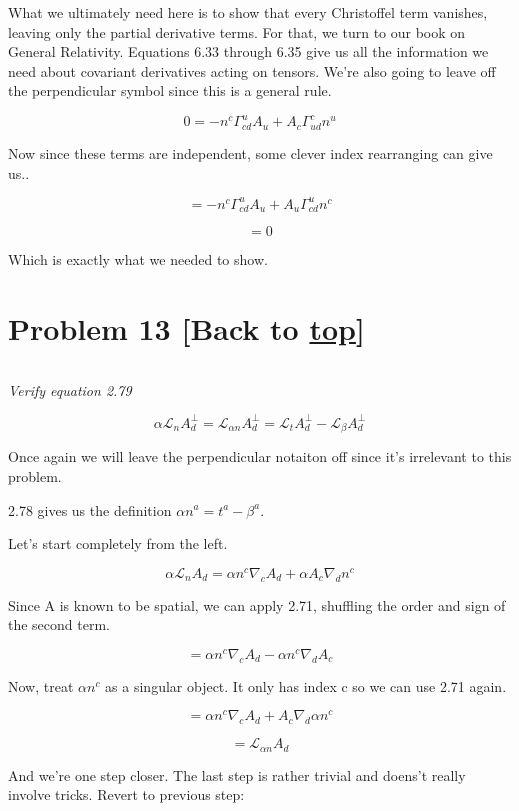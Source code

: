 \documentclass[landscape,letterpaper,10pt,english]{article}
\begin{document}
    What we ultimately need here is to show that every Christoffel term
vanishes, leaving only the partial derivative terms. For that, we turn
to our book on General Relativity. Equations 6.33 through 6.35 give us
all the information we need about covariant derivatives acting on
tensors. We're also going to leave off the perpendicular symbol since
this is a general rule.

\[ 0 = - n^c \Gamma^u_{cd} A_u + A_c \Gamma^c_{ud} n^u \]

Now since these terms are independent, some clever index rearranging can
give us..

\[ = - n^c \Gamma^u_{cd} A_u + A_u \Gamma^u_{cd} n^c \]

\[ = 0 \]

Which is exactly what we needed to show.

    \hypertarget{problem-13-back-to-top}{%
\section{\texorpdfstring{Problem 13 {[}Back to
\hyperref[toc]{top}{]}}{Problem 13 {[}Back to {]}}}\label{problem-13-back-to-top}}

\[\label{P13}\]

\emph{Verify equation 2.79}

\[\alpha \mathcal{L}_n A^\perp_d = \mathcal{L}_{\alpha n} A^\perp_d = \mathcal{L}_t A^\perp_d - \mathcal{L}_\beta A^\perp_d \]

Once again we will leave the perpendicular notaiton off since it's
irrelevant to this problem.

    2.78 gives us the definition \(\alpha n^a = t^a - \beta^a\).

Let's start completely from the left.

\[\alpha \mathcal{L}_n A_d =  \alpha n^c \nabla_c A_d + \alpha A_c \nabla_d n^c\]

Since A is known to be spatial, we can apply 2.71, shuffling the order
and sign of the second term.

\[ =  \alpha n^c \nabla_c A_d - \alpha n^c \nabla_d A_c \]

Now, treat \(\alpha n^c\) as a singular object. It only has index c so
we can use 2.71 again.

\[ =  \alpha n^c \nabla_c A_d + A_c \nabla_d \alpha n^c \]

\[ = \mathcal{L}_{\alpha n} A_d \]

And we're one step closer. The last step is rather trivial and doens't
really involve tricks. Revert to previous step:
\end{document}
